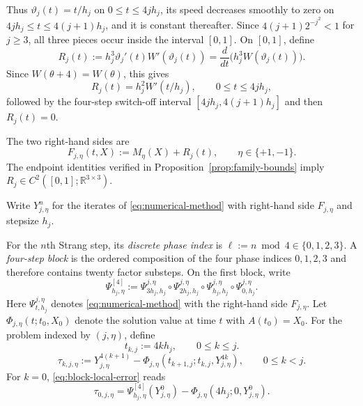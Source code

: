 \documentclass[]{article}
\numberwithin{equation}{section}
\theoremstyle{plain}
\theoremstyle{remark}
\newcommand{\R}{\mathbb{R}}
\begin{document}
Thus $\vartheta_j(t)=t/h_j$ on $0\le t\le4jh_j$, its speed decreases
smoothly to zero on $4jh_j\le t\le4(j+1)h_j$, and it is constant
thereafter.  Since $4(j+1)2^{-j^2}<1$ for $j\ge3$, all three pieces
occur inside the interval $[0,1]$.
On $[0,1]$, define
\begin{equation}\label{eq:R-def}
 R_j(t):=h_j^3\vartheta_j'(t)W'(\vartheta_j(t))
 =\frac{d}{dt}\bigl(h_j^3W(\vartheta_j(t))\bigr).
\end{equation}
Since $W(\theta+4)=W(\theta)$, this gives
\begin{equation}\label{eq:periodic-forcing}
 R_j(t)=h_j^2W'(t/h_j),\qquad 0\le t\le4jh_j,
\end{equation}
followed by the four-step switch-off interval
$[4jh_j,4(j+1)h_j]$ and then $R_j(t)=0$.

The two right-hand sides are
\begin{equation}\label{eq:full-field}
 F_{j,\eta}(t,X):=M_\eta(X)+R_j(t),
 \qquad \eta\in\{+1,-1\}.
\end{equation}
The endpoint identities verified in Proposition~\ref{prop:family-bounds}
imply
$R_j\in C^2([0,1];\R^{3\times3})$.

Write $Y_{j,\eta}^n$ for the iterates of \eqref{eq:numerical-method}
with right-hand side $F_{j,\eta}$ and stepsize $h_j$.

For the $n$th Strang step, its \emph{discrete phase index} is
$\ell:=n\bmod4\in\{0,1,2,3\}$.  A \emph{four-step block} is the ordered
composition of the four phase indices $0,1,2,3$ and therefore contains twenty
factor substeps.  On the first block, write
\begin{equation}\label{eq:four-step-map}
 \Psi^{[4]}_{h_j,\eta}:=
 \Psi^{j,\eta}_{3h_j,h_j}\circ
  \Psi^{j,\eta}_{2h_j,h_j}\circ
  \Psi^{j,\eta}_{h_j,h_j}\circ
  \Psi^{j,\eta}_{0,h_j}.
\end{equation}
Here $\Psi^{j,\eta}_{t,h_j}$ denotes
\eqref{eq:numerical-method} with the right-hand side $F_{j,\eta}$.
Let $\Phi_{j,\eta}(t;t_0,X_0)$ denote the solution value at time $t$ with
$A(t_0)=X_0$.  For the problem indexed by $(j,\eta)$, define
\begin{equation}\label{eq:block-objects}
 t_{k,j}:=4kh_j,
 \qquad 0\le k\le j.
\end{equation}
\begin{equation}
 \tau_{k,j,\eta}
 :=Y_{j,\eta}^{4(k+1)}
 -\Phi_{j,\eta}(t_{k+1,j};t_{k,j},Y_{j,\eta}^{4k}),
 \qquad 0\le k<j.
 \label{eq:block-local-error}
\end{equation}
For $k=0$, \eqref{eq:block-local-error} reads
\begin{equation}\label{eq:first-block-local-error}
 \tau_{0,j,\eta}
 =\Psi^{[4]}_{h_j,\eta}(Y^0_{j,\eta})
 -\Phi_{j,\eta}(4h_j;0,Y^0_{j,\eta}).
\end{equation}
\end{document}
